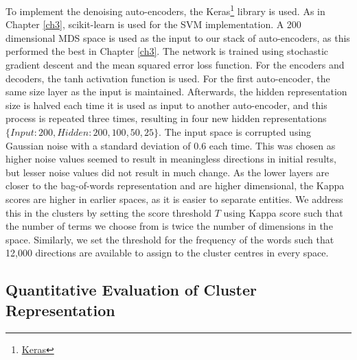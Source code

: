 To implement the denoising auto-encoders, the Keras\footnote{\href{https://keras.io/}{Keras}}  library is used. As in Chapter \ref{ch3}, scikit-learn is used for the SVM implementation.  A 200 dimensional MDS space is used as the input to our stack of auto-encoders, as this performed the best in Chapter \ref{ch3}. The network is trained using stochastic gradient descent and the mean squared error loss function. For the encoders and decoders, the tanh activation function is used. For the first auto-encoder,  the same size layer as the input is maintained. Afterwards, the hidden representation size is halved each time it is used  as input to another auto-encoder, and this process is repeated three times, resulting in four new hidden representations $\{Input: 200, Hidden: 200, 100, 50, 25\}$. The input space is corrupted using  Gaussian noise with a standard deviation of 0.6 each time. This was chosen as higher noise values seemed to result in meaningless directions in initial results, but lesser noise values did not result in much change. As the lower layers are closer to the bag-of-words representation and are higher dimensional, the Kappa scores are higher in earlier spaces, as it is easier to separate entities. We address this in the clusters by setting the  score threshold $T$ using Kappa score  such that the number of terms we choose from is twice the number of dimensions in the space. Similarly, we set the threshold for the frequency of the words such that 12,000 directions are available to assign to the cluster centres in every space. 

\subsection{Quantitative Evaluation of Cluster Representation}\label{quan-auto}








